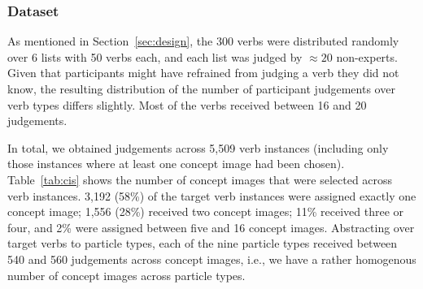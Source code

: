 \documentclass[output=paper]{langsci/langscibook}
\begin{document}
\subsubsection{Dataset}

As mentioned in Section~\ref{sec:design}, the 300 verbs were
distributed randomly over 6 lists with 50 verbs each, and each list
was judged by ${\approx}20$ non-experts. Given that participants might
have refrained from judging a verb they did not know, the resulting
distribution of the number of participant judgements over verb types
differs slightly.
Most of the verbs received between 16 and 20 judgements.

%
%
%

In total, we obtained judgements across 5,509 verb instances
(including only those instances where at least one concept image had
been chosen).
Table~\ref{tab:cis} shows the number of concept images that were selected across
verb instances.  3,192 (58\%) of the target verb instances were
assigned exactly one concept image; 1,556 (28\%) received two concept
images; 11\% received three or four, and 2\% were assigned between
five and 16 concept images. Abstracting over target verbs to particle
types, each of the nine particle types received between 540 and 560
judgements across concept images, i.e., we have a rather homogenous number of concept images
across particle types.


\begin{table}
  \caption{Number of selected concept images per verb instance.\label{tab:cis}}
\end{table}
\end{document}
